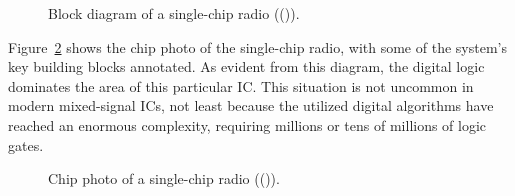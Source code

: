 \documentclass[
  11pt,
  letterpaper,
  abstract]{scrbook}
\begin{document}
\begin{figure}


\caption{\label{fig-1.2}Block diagram of a single-chip radio
(()).}

\end{figure}%

Figure~\ref{fig-1.3} shows the chip photo of the single-chip radio, with
some of the system's key building blocks annotated. As evident from this
diagram, the digital logic dominates the area of this particular IC.
This situation is not uncommon in modern mixed-signal ICs, not least
because the utilized digital algorithms have reached an enormous
complexity, requiring millions or tens of millions of logic gates.

\begin{figure}


\caption{\label{fig-1.3}Chip photo of a single-chip radio
(()).}

\end{figure}%
\end{document}
